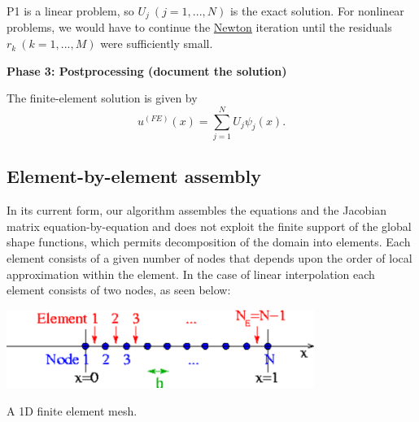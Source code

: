 \begin{DoxyItemize}
\item P1 is a linear problem, so $ U_j \ (j=1,...,N) $ is the exact solution. For nonlinear problems, we would have to continue the \hyperlink{index_Newton}{Newton} iteration until the residuals $r_k \ (k=1,...,M) $ were sufficiently small.
\end{DoxyItemize}

{\bfseries  Phase 3\-: Postprocessing (document the solution)}
\begin{DoxyItemize}
\item The finite-\/element solution is given by \[ u^{(FE)}(x) = \sum_{j=1}^{N} U_j \psi_j(x). \]
\end{DoxyItemize}



\hypertarget{index_element_by_element}{}\subsection{Element-\/by-\/element assembly}\label{index_element_by_element}
In its current form, our algorithm assembles the equations and the Jacobian matrix equation-\/by-\/equation and does not exploit the finite support of the global shape functions, which permits decomposition of the domain into elements. Each element consists of a given number of nodes that depends upon the order of local approximation within the element. In the case of linear interpolation each element consists of two nodes, as seen below\-:  
\begin{DoxyImage}
\includegraphics[width=0.75\textwidth]{1Dmesh}
\caption{A 1\-D finite element mesh. }
\end{DoxyImage}


